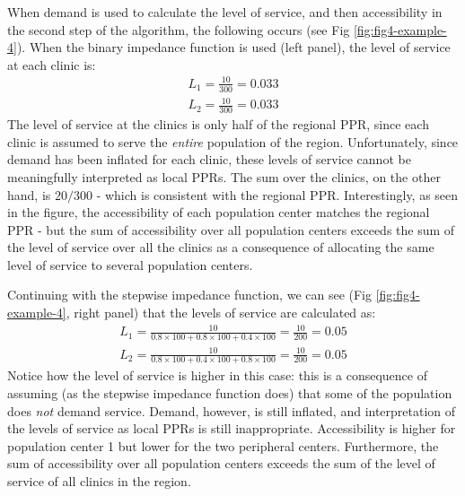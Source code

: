 \documentclass[10pt,letterpaper]{article}
\begin{document}
When demand is used to calculate the level of service, and then
accessibility in the second step of the algorithm, the following occurs
(see Fig \ref{fig:fig4-example-4}). When the binary impedance function
is used (left panel), the level of service at each clinic is: \[
\begin{array}{c}
L_1 = \frac{10}{300} = 0.033\\
L_2 = \frac{10}{300} = 0.033
\end{array}
\] The level of service at the clinics is only half of the regional PPR,
since each clinic is assumed to serve the \emph{entire} population of
the region. Unfortunately, since demand has been inflated for each
clinic, these levels of service cannot be meaningfully interpreted as
local PPRs. The sum over the clinics, on the other hand, is \(20/300\) -
which is consistent with the regional PPR. Interestingly, as seen in the
figure, the accessibility of each population center matches the regional
PPR - but the sum of accessibility over all population centers exceeds
the sum of the level of service over all the clinics as a consequence of
allocating the same level of service to several population centers.

Continuing with the stepwise impedance function, we can see (Fig
\ref{fig:fig4-example-4}, right panel) that the levels of service are
calculated as: \[
\begin{array}{c}
L_1 = \frac{10}{0.8\times 100 + 0.8\times 100 + 0.4\times 100} = \frac{10}{200} = 0.05\\
L_2 = \frac{10}{0.8\times 100 + 0.4\times 100 + 0.8\times 100} = \frac{10}{200} = 0.05
\end{array}
\] Notice how the level of service is higher in this case: this is a
consequence of assuming (as the stepwise impedance function does) that
some of the population does \emph{not} demand service. Demand, however,
is still inflated, and interpretation of the levels of service as local
PPRs is still inappropriate. Accessibility is higher for population
center 1 but lower for the two peripheral centers. Furthermore, the sum
of accessibility over all population centers exceeds the sum of the
level of service of all clinics in the region.
\end{document}

